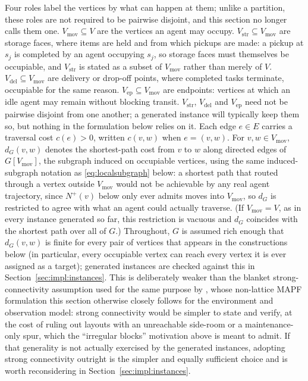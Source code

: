 \documentclass[../main.tex]{subfiles}
\begin{document}
Four roles label the vertices by what can happen at them; unlike a partition, %
these roles are not required to be pairwise disjoint, and this section no longer
calls them one. $V_{\mathrm{mov}} \subseteq V$ are the vertices an agent may
occupy. $V_{\mathrm{str}} \subseteq V_{\mathrm{mov}}$ are storage faces, where
items are held and from which pickups are made: a pickup at $s_j$ is completed
by an agent occupying $s_j$, so storage faces must themselves be occupiable, and
$V_{\mathrm{str}}$ is stated as a subset of $V_{\mathrm{mov}}$ rather than merely
of $V$. $V_{\mathrm{del}} \subseteq V_{\mathrm{mov}}$ are delivery or drop-off
points, where completed tasks terminate, occupiable for the same reason.
$V_{\mathrm{ep}} \subseteq V_{\mathrm{mov}}$ are endpoints: vertices at which an
idle agent may remain without blocking transit. $V_{\mathrm{str}}$,
$V_{\mathrm{del}}$ and $V_{\mathrm{ep}}$ need not be pairwise disjoint from one
another; a generated instance will typically keep them so, but nothing in the
formulation below relies on it. Each edge $e \in E$ carries a traversal cost
$c(e) > 0$, written $c(v,w)$ when $e = (v,w)$. For $v,w \in V_{\mathrm{mov}}$, %
$d_G(v,w)$ denotes the shortest-path cost from $v$ to $w$ along directed edges
of $G[V_{\mathrm{mov}}]$, the subgraph induced on occupiable vertices, using
the same induced-subgraph notation as \eqref{eq:localsubgraph} below: a
shortest path that routed through a vertex outside $V_{\mathrm{mov}}$ would
not be achievable by any real agent trajectory, since $N^{+}(v)$ below only
ever admits moves into $V_{\mathrm{mov}}$, so $d_G$ is restricted to agree
with what an agent could actually traverse. (If $V_{\mathrm{mov}} = V$, as in
every instance generated so far, this restriction is vacuous and $d_G$
coincides with the shortest path over all of $G$.) Throughout, $G$ is assumed rich enough that $d_G(v,w)$ is
finite for every pair of vertices that appears in the constructions below (in
particular, every occupiable vertex can reach every vertex it is ever assigned
as a target); generated instances are checked against this in
Section~\ref{sec:impl:instances}. %
This is deliberately weaker than the blanket strong-connectivity assumption used
for the same purpose by \citet{knippenberg2021}, whose non-lattice MAPF
formulation this section otherwise closely follows for the environment and
observation model: strong connectivity would be simpler to state and verify, at
the cost of ruling out layouts with an unreachable side-room or a
maintenance-only spur, which the ``irregular blocks'' motivation above is meant
to admit. If that generality is not actually exercised by the generated
instances, adopting strong connectivity outright is the simpler and equally
sufficient choice and is worth reconsidering in Section~\ref{sec:impl:instances}. %
\end{document}
